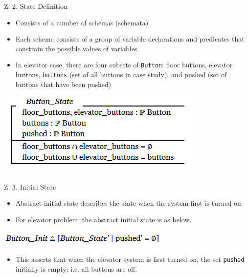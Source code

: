 \documentclass{beamer}
\begin{document}
	\begin{frame}{Z: 2. State Definition}
    	\begin{itemize}
            \item Consists of a number of schemas (schemata)
            \item Each schema consists of a group of variable declarations and predicates that constrain the possible values of variables.
            \item In elevator case, there are four subsets of \texttt{Button}: floor buttons, elevator buttons, \texttt{buttons} (set of all buttons in case study), and pushed (set of buttons that have been pushed)
	    \end{itemize}
	    \includegraphics[scale=0.5]{img/03_z_button_state_schema.png}
	\end{frame}
	\begin{frame}{Z: 3. Initial State}
    	\begin{itemize}
            \item Abstract initial state describes the state when the system first is turned on.
            \item For elevator problem, the abstract initial state is as below.
	    \end{itemize}
	    \includegraphics[scale=0.5]{img/03_z_initial_state.png}
    	\begin{itemize}
            \item This asserts that when the elevator system is first turned on, the set \texttt{pushed} initially is empty; i.e. all buttons are off.
	    \end{itemize}
	\end{frame}
\end{document}
